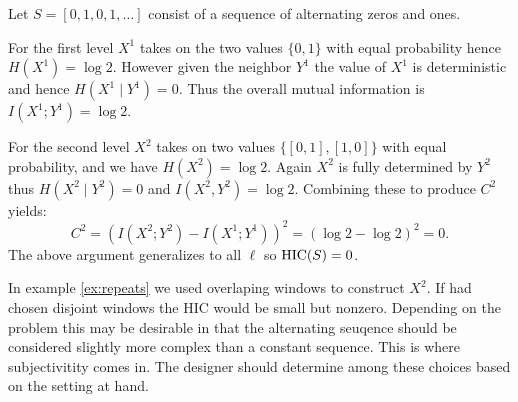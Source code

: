 \begin{example}
  \label{ex:repeats}
  Let $S = [0, 1, 0, 1, \ldots]$ consist of a sequence of alternating zeros and
  ones.

  For the first level $X^1$ takes on the two values $\{0, 1\}$ with equal
  probability hence $H(X^1) = \log 2$. However given the neighbor $Y^1$ the
  value of $X^1$ is deterministic and hence $H(X^1 \mid Y^1) = 0$. Thus the
  overall mutual information is $I(X^1; Y^1) = \log 2$.

  For the second level $X^2$ takes on two values $\{[0, 1], [1, 0]\}$ with
  equal probability, and we have $H(X^2) = \log 2$. Again $X^2$ is fully
  determined by $Y^2$ thus $H(X^2 \mid Y^2) = 0$ and $I(X^2, Y^2) = \log 2$.
  Combining these to produce $C^2$ yields:
  \begin{equation}
    C^2 = (I(X^2; Y^2) - I(X^1; Y^1))^2 = (\log 2 - \log 2)^2 = 0.
  \end{equation}
  The above argument generalizes to all $\ell$ so $\textup{HIC}(S) = 0$.
\end{example}

In example \ref{ex:repeats} we used overlaping windows to construct $X^2$. If
had chosen disjoint windows the HIC would be small but nonzero. Depending on
the problem this may be desirable in that the alternating seuqence should be
considered slightly more complex than a constant sequence. This is where
subjectivitity comes in. The designer should determine among these choices
based on the setting at hand.
